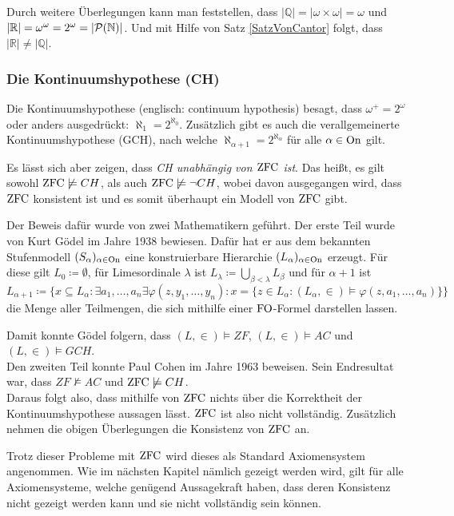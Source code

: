 Durch weitere Überlegungen kann man feststellen, dass $\vert \mathbb{Q} \vert=\vert \omega\times\omega \vert = \omega$ und $\vert \mathbb{R} \vert = \omega^\omega = 2^\omega=\vert \mathcal{P}(\mathbb{N})\vert$. Und mit Hilfe von Satz \ref{SatzVonCantor} folgt, dass $\vert \mathbb{R} \vert \neq \vert \mathbb{Q} \vert$.

\subsubsection{Die Kontinuumshypothese (CH)}

Die Kontinuumshypothese (englisch: continuum hypothesis) besagt, dass $\omega^+=2^\omega$ oder anders ausgedrückt: $\aleph_1=2^{\aleph_0}$. Zusätzlich gibt es auch die verallgemeinerte Kontinuumshypothese (GCH), nach welche $\aleph_{\alpha+1}=2^{\aleph_\alpha}$ für alle $\alpha\in \operatorname{On}$ gilt.
\par

Es lässt sich aber zeigen, dass \textit{CH unabhängig von $\operatorname{ZFC}$ ist}. Das heißt, es gilt sowohl $\operatorname{ZFC} \not\models CH$, als auch $\operatorname{ZFC} \not\models \neg CH$, wobei davon ausgegangen wird, dass $\operatorname{ZFC}$ konsistent ist und es somit überhaupt ein Modell von $\operatorname{ZFC}$ gibt.

Der Beweis dafür wurde von zwei Mathematikern geführt. Der erste Teil wurde von Kurt Gödel im Jahre 1938 bewiesen. Dafür hat er aus dem bekannten Stufenmodell $(S_\alpha)_{\alpha\in \operatorname{On}}$ eine konstruierbare Hierarchie $(L_\alpha)_{\alpha\in \operatorname{On}}$ erzeugt. 
Für diese gilt $L_0\coloneqq\emptyset$, für Limesordinale $\lambda$ ist $L_\lambda\coloneqq \bigcup_{\beta<\lambda}L_\beta$ und für $\alpha+1$ ist $L_{\alpha+1}\coloneqq\{x\subseteq L_\alpha : \exists a_1,\dots,a_n\exists\varphi(z,y_1,\dots,y_n) : x=\{z\in L_\alpha : (L_\alpha,\in) \models \varphi(z,a_1,\dots, a_n)\}\}$ die Menge aller Teilmengen, die sich mithilfe einer $\operatorname{FO}$-Formel darstellen lassen.

Damit konnte Gödel folgern, dass $(L,\in)\models ZF$, $(L,\in)\models AC$ und $(L,\in)\models GCH$.
\\
Den zweiten Teil konnte Paul Cohen im Jahre 1963 beweisen. Sein Endresultat war, dass $ZF\not\models AC$ und $\operatorname{ZFC} \not\models CH$.
\\
Daraus folgt also, dass mithilfe von $\operatorname{ZFC}$ nichts über die Korrektheit der Kontinuumshypothese aussagen lässt. $\operatorname{ZFC}$ ist also nicht vollständig. Zusätzlich nehmen die obigen Überlegungen die Konsistenz von $\operatorname{ZFC}$ an.

Trotz dieser Probleme mit $\operatorname{ZFC}$ wird dieses als \glqq Standard\grqq{} Axiomensystem angenommen. Wie im nächsten Kapitel nämlich gezeigt werden wird, gilt für alle Axiomensysteme, welche genügend Aussagekraft haben, dass deren Konsistenz nicht gezeigt werden kann und sie nicht vollständig sein können.

